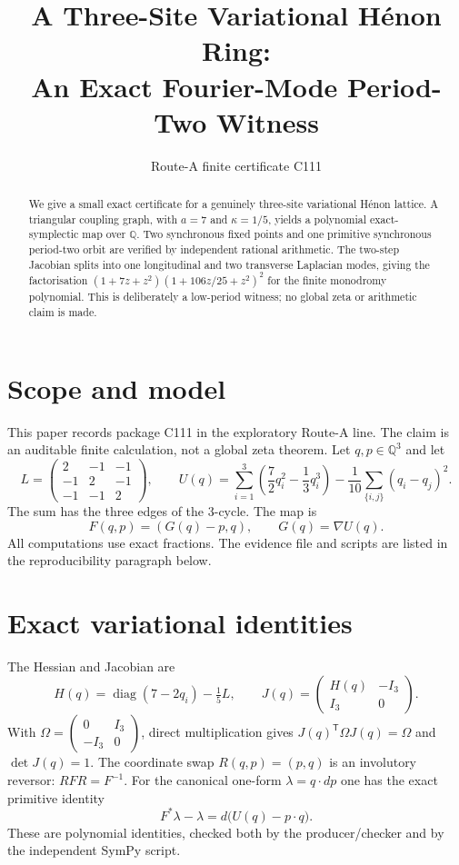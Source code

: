 \documentclass[10pt]{article}
\title{A Three-Site Variational H\'enon Ring:\\ An Exact Fourier-Mode Period-Two Witness}
\author{Route-A finite certificate C111}
\date{}
\newcommand{\Q}{\mathbb{Q}}
\begin{document}
\maketitle
\begin{abstract}
We give a small exact certificate for a genuinely three-site variational H\'enon lattice. A triangular coupling graph, with $a=7$ and $\kappa=1/5$, yields a polynomial exact-symplectic map over $\Q$. Two synchronous fixed points and one primitive synchronous period-two orbit are verified by independent rational arithmetic. The two-step Jacobian splits into one longitudinal and two transverse Laplacian modes, giving the factorisation $(1+7z+z^2)(1+106z/25+z^2)^2$ for the finite monodromy polynomial. This is deliberately a low-period witness; no global zeta or arithmetic claim is made.
\end{abstract}
\section{Scope and model}
This paper records package C111 in the exploratory Route-A line. The claim is
an auditable finite calculation, not a global zeta theorem. Let $q,p\in
\Q^3$ and let
\[
 L=\begin{pmatrix}2&-1&-1\\-1&2&-1\\-1&-1&2\end{pmatrix},\qquad
 U(q)=\sum_{i=1}^3\left(\frac{7}{2}q_i^2-\frac13q_i^3\right)
 -\frac1{10}\sum_{\{i,j\}}(q_i-q_j)^2 .
\]
The sum has the three edges of the $3$-cycle. The map is
\begin{equation}
 F(q,p)=(G(q)-p,q),\qquad G(q)=\nabla U(q).
 \label{eq:map}
\end{equation}
All computations use exact fractions. The evidence file and scripts are
listed in the reproducibility paragraph below.

\section{Exact variational identities}
The Hessian and Jacobian are
\[
 H(q)=\operatorname{diag}(7-2q_i)-\tfrac15L,\qquad
 J(q)=\begin{pmatrix}H(q)&-I_3\\ I_3&0\end{pmatrix}.
\]
With $\Omega=\left(\begin{smallmatrix}0&I_3\\-I_3&0\end{smallmatrix}\right)$,
direct multiplication gives $J(q)^\mathsf{T}\Omega J(q)=\Omega$ and
$\det J(q)=1$. The coordinate swap $R(q,p)=(p,q)$ is an involutory
reversor: $RFR=F^{-1}$. For the canonical one-form
$\lambda=q\mathbin{\cdot}dp$ one has the exact primitive identity
\[
 F^*\lambda-\lambda=d\bigl(U(q)-p\mathbin{\cdot}q\bigr).
\]
These are polynomial identities, checked both by the producer/checker and by
the independent SymPy script.
\end{document}

